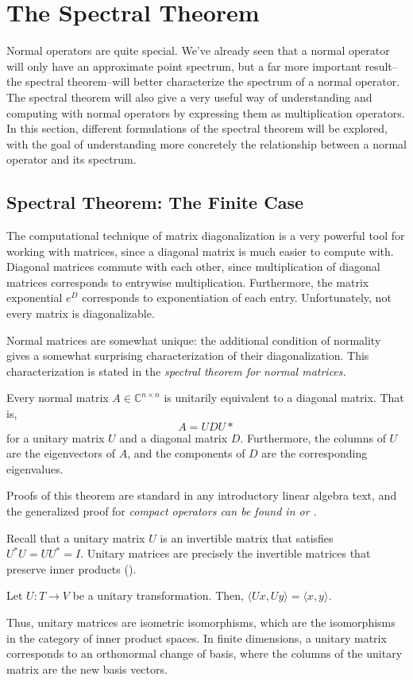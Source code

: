 \section{The Spectral Theorem}
Normal operators are quite special. We've already seen that a normal operator
will only have an approximate point spectrum, but a far more important
result--the spectral theorem--will better characterize the spectrum of a normal
operator. The spectral theorem will also give a very useful way of understanding
and computing with normal operators by expressing them as multiplication
operators. In this section, different formulations of the spectral theorem will
be explored, with the goal of understanding more concretely the relationship
between a normal operator and its spectrum.

\subsection{Spectral Theorem: The Finite Case}
The computational technique of matrix diagonalization is a very powerful tool
for working with matrices, since a diagonal matrix is much easier to compute
with. Diagonal matrices commute with each other, since multiplication of
diagonal matrices corresponds to entrywise multiplication. Furthermore, the
matrix exponential $e^D$ corresponds to exponentiation of each entry.
Unfortunately, not every matrix is diagonalizable.

Normal matrices are somewhat unique: the additional condition of normality gives
a somewhat surprising characterization of their diagonalization. This
characterization is stated in the \em spectral theorem \em for normal matrices.
\begin{theorem}
    Every normal matrix $A\in\mathbb{C}^{n\times n}$ is unitarily equivalent to
    a diagonal matrix. That is,
    \[
        A = UDU*
    \]
    for a unitary matrix $U$ and a diagonal matrix $D$. Furthermore, the columns
    of $U$ are the eigenvectors of $A$, and the components of $D$ are the
    corresponding eigenvalues.
\end{theorem}
Proofs of this theorem are standard in any introductory linear algebra
text, and the generalized proof for \em compact \em operators can be found in
\cite[Ch. 17.3]{Lang1993} or \cite[p. 91]{MacCluer2009}.

Recall that a unitary matrix $U$ is an invertible matrix that satisfies $U^*U =
UU^* = I$.
Unitary matrices are precisely the invertible matrices that preserve inner
products (\cite[p. 39-40]{MacCluer2009}).
\begin{theorem}
    Let $U:T\to V$ be a unitary transformation. Then, $\langle Ux,Uy\rangle =
    \langle x,y \rangle$.
\end{theorem}
Thus, unitary matrices are isometric isomorphisms, which are the isomorphisms in
the category of inner product spaces. In finite dimensions, a unitary matrix
corresponds to an orthonormal change of basis, where the columns of the unitary
matrix are the new basis vectors.

